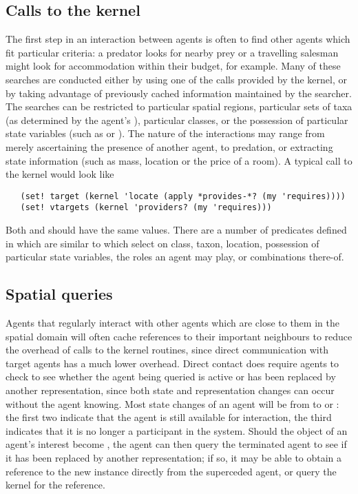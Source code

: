 \subsection{Calls to the kernel}\label{interactions}
The first step in an interaction between agents is often to find other
agents which fit particular criteria: a predator looks for nearby prey
or a travelling salesman might look for accommodation within their
budget, for example.  Many of these searches are conducted either by
using one of the  calls provided by the kernel, or by
taking advantage of previously cached information maintained by the
searcher. The searches can be restricted to particular spatial
regions, particular sets of taxa (as determined by the agent's
), particular classes, or the possession of particular
state variables (such as  or
). The nature of the interactions may range from
merely ascertaining the presence of another agent, to predation, or
extracting state information (such as mass, location or the price of a
room).  A typical call to the kernel would look like
\begin{verbatim}
   (set! target (kernel 'locate (apply *provides-*? (my 'requires))))
   (set! vtargets (kernel 'providers? (my 'requires)))
\end{verbatim}
Both  and  should have the same
values.  There are a number of predicates defined
in  which are similar to 
which select on class, taxon, location, possession of particular state
variables, the roles an agent may play, or combinations there-of.

\subsection{Spatial queries}
Agents that regularly interact with other agents which are close to
them in the spatial domain will often cache references to their
important neighbours to reduce the overhead of calls to the kernel
routines, since direct communication with target agents has a much
lower overhead. Direct contact does require agents to check to see
whether the agent being queried is active or has been replaced by
another representation, since both state and representation changes
can occur without the agent knowing. Most state changes of an agent
will be from  to 
or : the first two indicate that the agent is
still available for interaction, the third indicates that it is no
longer a participant in the system. Should the object of an agent's
interest become , the agent can then query the
terminated agent to see if it has been replaced by another
representation; if so, it may be able to obtain a reference to the new
instance directly from the superceded agent, or query the kernel for
the reference.


